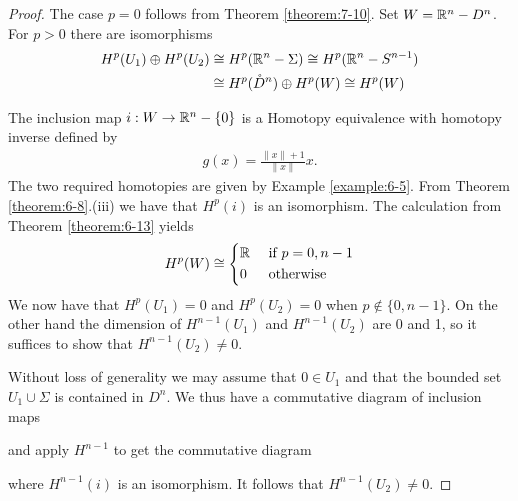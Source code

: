 \begin{proof}
  The case $p = 0$ follows from Theorem \ref{theorem:7-10}. Set $W={\mathbb{R}}^n-D^n$. 
  For $p > 0$ there are isomorphisms
  \begin{align*}
    H^p(U_1)\oplus H^p(U_2) 
    & \cong H^p({\mathbb{R}}^n -\Sigma ) \cong H^p({\mathbb{R}}^n -S^{n-1} )\\
    & \cong H^p(\mathring{D}^n)\oplus H^p(W)\cong H^p(W)
  \end{align*}

  The inclusion map $i:W\to{\ensuremath{\mathbb{R}}}^n-\{0\}$ is a Homotopy equivalence with homotopy inverse defined by 
  \begin{align*}
    g(x) = \frac{\|x\| +  1}{\|x\|}x.
  \end{align*}
  The two required homotopies are given by Example \ref{example:6-5}. From Theorem 
  \ref{theorem:6-8}.(iii) we have that $H^p(i)$ is an isomorphism. The calculation from 
  Theorem \ref{theorem:6-13} yields
  \begin{align*}
    H^p(W) \cong \left\{\begin{aligned}
      & {\mathbb{R}} && \text{ if } p = 0, n-1 \\
      & 0 && \text{ otherwise }
    \end{aligned}\right.
  \end{align*}
  We now have that $H^p(U_1) = 0$ and $H^p(U_2) = 0$ when $p\notin \{0, n-1\}$. On the other hand the dimension
  of $H^{n-1}(U_1)$ and $H^{n-1}(U_2)$ are 0 and 1, so it suffices to show that $H^{n-1}(U_2)\neq 0$.

  Without loss of generality we may assume that $0\in U_1$ and that the bounded set
  $U_1\cup\Sigma$ is contained in $D^n$. We thus have a commutative diagram of inclusion maps

  \begin{center}
  \end{center}

  and apply $H^{n - 1}$ to get the commutative diagram
  \begin{center}
  \end{center}
  where $H^{n-1}(i)$ is an isomorphism. It follows that $H^{n-1}(U_2)\neq 0$.
\end{proof}

